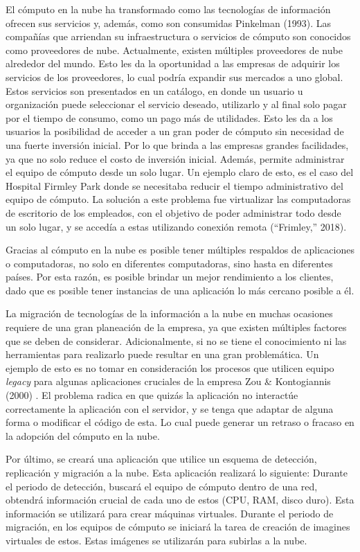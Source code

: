 \documentclass[12pt,twoside]{reedthesis}
\begin{document}
El cómputo en la nube ha transformado como las tecnologías de información ofrecen sus servicios y, además, como son consumidas Pinkelman (1993). Las compañías que arriendan su infraestructura o servicios de cómputo son conocidos como proveedores de nube. Actualmente, existen múltiples proveedores de nube alrededor del mundo. Esto les da la oportunidad a las empresas de adquirir los servicios de los proveedores, lo cual podría expandir sus mercados a uno global. Estos servicios son presentados en un catálogo, en donde un usuario u organización puede seleccionar el servicio deseado, utilizarlo y al final solo pagar por el tiempo de consumo, como un pago más de utilidades. Esto les da a los usuarios la posibilidad de acceder a un gran poder de cómputo sin necesidad de una fuerte inversión inicial. Por lo que brinda a las empresas grandes facilidades, ya que no solo reduce el costo de inversión inicial. Además, permite administrar el equipo de cómputo desde un solo lugar. Un ejemplo claro de esto, es el caso del Hospital Firmley Park donde se necesitaba reducir el tiempo administrativo del equipo de cómputo. La solución a este problema fue virtualizar las computadoras de escritorio de los empleados, con el objetivo de poder administrar todo desde un solo lugar, y se accedía a estas utilizando conexión remota (``Frimley,'' 2018).

Gracias al cómputo en la nube es posible tener múltiples respaldos de aplicaciones o computadoras, no solo en diferentes computadoras, sino hasta en diferentes países. Por esta razón, es posible brindar un mejor rendimiento a los clientes, dado que es posible tener instancias de una aplicación lo más cercano posible a él.

La migración de tecnologías de la información a la nube en muchas ocasiones requiere de una gran planeación de la empresa, ya que existen múltiples factores que se deben de considerar. Adicionalmente, si no se tiene el conocimiento ni las herramientas para realizarlo puede resultar en una gran problemática. Un ejemplo de esto es no tomar en consideración los procesos que utilicen equipo \emph{legacy} para algunas aplicaciones cruciales de la empresa Zou \& Kontogiannis (2000) . El problema radica en que quizás la aplicación no interactúe correctamente la aplicación con el servidor, y se tenga que adaptar de alguna forma o modificar el código de esta. Lo cual puede generar un retraso o fracaso en la adopción del cómputo en la nube.

Por último, se creará una aplicación que utilice un esquema de detección, replicación y migración a la nube. Esta aplicación realizará lo siguiente: Durante el periodo de detección, buscará el equipo de cómputo dentro de una red, obtendrá información crucial de cada uno de estos (CPU, RAM, disco duro). Esta información se utilizará para crear máquinas virtuales. Durante el periodo de migración, en los equipos de cómputo se iniciará la tarea de creación de imagines virtuales de estos. Estas imágenes se utilizarán para subirlas a la nube.
\end{document}

